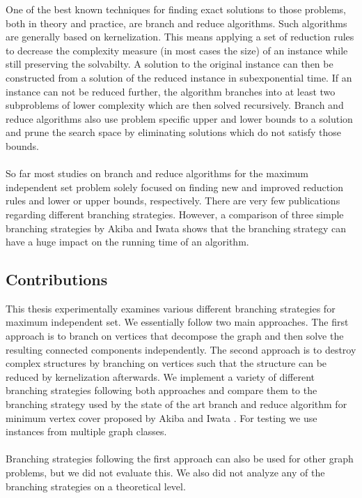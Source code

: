 \documentclass[]{article}
\begin{document}
One of the best known techniques for finding exact solutions to those problems, both  in theory and practice, are branch and reduce algorithms. Such algorithms are generally based on kernelization. This means applying a set of reduction rules to decrease the complexity measure (in most cases the size) of an instance while still preserving the solvabilty. A solution to the original instance can then be constructed from a solution of the reduced instance in subexponential time. If an instance can not be reduced further, the algorithm branches into at least two subproblems of lower complexity which are then solved recursively. Branch and reduce algorithms also use problem specific upper and lower bounds to a solution and prune the search space by eliminating solutions which do not satisfy those bounds. \paragraph{}
So far most studies on branch and reduce algorithms for the maximum independent set problem solely focused on finding new and improved reduction rules and lower or upper bounds, respectively. There are very few publications regarding different branching strategies. However, a comparison of three simple branching strategies by Akiba and Iwata \cite{AkibaIwata} shows that the branching strategy can have a huge impact on the running time of an algorithm.

\subsection{Contributions}

This thesis experimentally examines various different branching strategies for maximum independent set. We essentially follow two main approaches. The first approach is to branch on vertices that decompose the graph and then solve the resulting connected components independently. The second approach is to destroy complex structures by branching on vertices such that the structure can be reduced by kernelization afterwards. We implement a variety of different branching strategies following both approaches and compare them to the branching strategy used by the state of the art branch and reduce algorithm for minimum vertex cover proposed by Akiba and Iwata \cite{AkibaIwata}. For testing we use instances from multiple graph classes.\paragraph{}
Branching strategies following the first approach can also be used for other graph problems, but we did not evaluate this. We also did not analyze any of the branching strategies on a theoretical level.  
\end{document}
